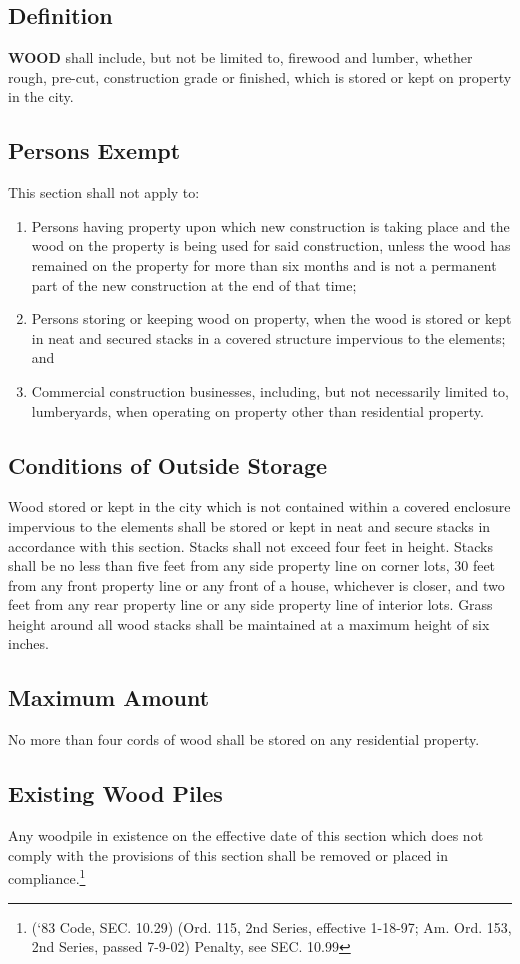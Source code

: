 \subsection{Definition}
\textbf{WOOD} shall include, but not be limited to, firewood and lumber, whether rough, pre-cut, construction grade or finished, which is stored or kept on property in the city.
\subsection{Persons Exempt}
This section shall not apply to:
\begin{enumerate}[{\indent}1)]
    \item Persons having property upon which new construction is taking place and the wood on the property is being used for said construction, unless the wood has remained on the property for more than six months and is not a permanent part of the new construction at the end of that time;
    \item Persons storing or keeping wood on property, when the wood is stored or kept in neat and secured stacks in a covered structure impervious to the elements; and
    \item Commercial construction businesses, including, but not necessarily limited to, lumberyards, when operating on property other than residential property.
\end{enumerate}
\subsection{Conditions of Outside Storage}
Wood stored or kept in the city which is not contained within a covered enclosure impervious to the elements shall be stored or kept in neat and secure stacks in accordance with this section.  Stacks shall not exceed four feet in height.  Stacks shall be no less than five feet from any side property line on corner lots, 30 feet from any front property line or any front of a house, whichever is closer, and two feet from any rear property line or any side property line of interior lots.  Grass height around all wood stacks shall be maintained at a maximum height of six inches.
\subsection{Maximum Amount}
No more than four cords of wood shall be stored on any residential property.
\subsection{Existing Wood Piles}
Any woodpile in existence on the effective date of this section which does not comply with the provisions of this section shall be removed or placed in compliance.\footnote{(‘83 Code, SEC. 10.29)  (Ord. 115, 2nd Series, effective 1-18-97; Am. Ord. 153, 2nd Series, passed 7-9-02)  Penalty, see SEC. 10.99}
